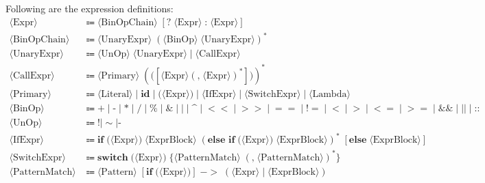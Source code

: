 \documentclass[11pt, a4paper]{article}
\begin{document}
Following are the expression definitions:
\begin{align*}
    \langle \text{Expr} \rangle &\Coloneqq \langle \text{BinOpChain} \rangle \; [ \textbf{?} \; \langle \text{Expr} \rangle \; \textbf{:} \; \langle \text{Expr} \rangle ] \\
    \langle \text{BinOpChain} \rangle &\Coloneqq \langle \text{UnaryExpr} \rangle \; ( \langle \text{BinOp} \rangle \; \langle \text{UnaryExpr} \rangle )^* \\
    \langle \text{UnaryExpr} \rangle &\Coloneqq \langle \text{UnOp} \rangle \; \langle \text{UnaryExpr} \rangle \mid \langle \text{CallExpr} \rangle \\
    \langle \text{CallExpr} \rangle &\Coloneqq \langle \text{Primary} \rangle \; ( \textbf{(} [\langle \text{Expr} \rangle (\textbf{,} \; \langle \text{Expr} \rangle)^*] \textbf{)} )^* \\
    \langle \text{Primary} \rangle &\Coloneqq \langle \text{Literal} \rangle \mid \textbf{id} \mid \textbf{(} \langle \text{Expr} \rangle \textbf{)} \mid \langle \text{IfExpr} \rangle \mid \langle \text{SwitchExpr} \rangle \mid \langle \text{Lambda} \rangle \\
    \langle \text{BinOp} \rangle &\Coloneqq \textbf{+} \mid \textbf{-} \mid \textbf{*} \mid \textbf{/} \mid \textbf{\%} \mid \textbf{\&} \mid \mathbf{|} \mid \textbf{\textasciicircum} \mid \mathbf{<<} \mid \mathbf{>>} \mid \mathbf{==} \mid \mathbf{!=} \mid \mathbf{<} \mid \mathbf{>} \mid  \mathbf{<=} \mid \mathbf{>=} \mid \textbf{\&\&} \mid \mathbf{||} \mid \textbf{::} \\
    \langle \text{UnOp} \rangle &\Coloneqq \textbf{!} \mid \sim \mid \textbf{-} \\
    \langle \text{IfExpr} \rangle &\Coloneqq \textbf{if} \; \textbf{(} \langle \text{Expr} \rangle \textbf{)} \; \langle \text{ExprBlock} \rangle \; (\textbf{else if} \; \textbf{(} \langle \text{Expr} \rangle \textbf{)}  \; \langle \text{ExprBlock} \rangle)^* \; [\textbf{else} \; \langle \text{ExprBlock} \rangle] \\
    \langle \text{SwitchExpr} \rangle &\Coloneqq \textbf{switch} \; \textbf{(} \langle \text{Expr} \rangle \textbf{)} \; \textbf{\{} \langle \text{PatternMatch} \rangle \; (\textbf{,} \; \langle \text{PatternMatch} \rangle)^* \textbf{\}} \\
    \langle \text{PatternMatch} \rangle &\Coloneqq \langle \text{Pattern} \rangle \; [\textbf{if} \; \textbf{(} \langle \text{Expr} \rangle \textbf{)}] \; \mathbf{-} \mathbf{>} \; (\langle \text{Expr} \rangle \mid \langle \text{ExprBlock} \rangle) \\

\end{align*}
\end{document}

